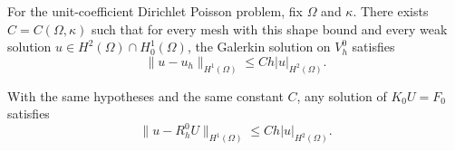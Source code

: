 \begin{theorem}
  \label{thm:p1-energy-error}
  \notready
  For the unit-coefficient Dirichlet Poisson problem, fix $\Omega$ and
  $\kappa$. There exists $C=C(\Omega,\kappa)$ such that for every mesh
  with this shape bound and every weak solution
  $u\in H^2(\Omega)\cap H_0^1(\Omega)$, the Galerkin solution on $V_h^0$
  satisfies
  \[
    \|u-u_h\|_{H^1(\Omega)}\le C h |u|_{H^2(\Omega)}.
  \]
\end{theorem}

\begin{corollary}
  \label{cor:p1-reduced-matrix-error}
  \notready
  With the same hypotheses and the same constant $C$, any solution of
  $K_0 U=F_0$ satisfies
  \[
    \|u-R_h^0 U\|_{H^1(\Omega)}\le C h |u|_{H^2(\Omega)}.
  \]
\end{corollary}
